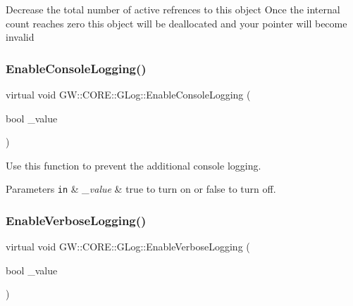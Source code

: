 Decrease the total number of active refrences to this object Once the internal count reaches zero this object will be deallocated and your pointer will become invalid \hypertarget{class_g_w_1_1_c_o_r_e_1_1_g_log_a9a486a646a0a02bb5724100c1849fcec}{}\label{class_g_w_1_1_c_o_r_e_1_1_g_log_a9a486a646a0a02bb5724100c1849fcec} 
\subsubsection{\texorpdfstring{Enable\+Console\+Logging()}{EnableConsoleLogging()}}
{\footnotesize\ttfamily virtual void G\+W\+::\+C\+O\+R\+E\+::\+G\+Log\+::\+Enable\+Console\+Logging (\begin{DoxyParamCaption}\item[{bool}]{\+\_\+value }\end{DoxyParamCaption})\hspace{0.3cm}{\ttfamily [pure virtual]}}

Use this function to prevent the additional console logging.


\begin{DoxyParams}[1]{Parameters}
\mbox{\tt in}  & {\em \+\_\+value} & true to turn on or false to turn off. \\
\hline
\end{DoxyParams}
\hypertarget{class_g_w_1_1_c_o_r_e_1_1_g_log_ac14e65291dba9480deadd772a8f0e307}{}\label{class_g_w_1_1_c_o_r_e_1_1_g_log_ac14e65291dba9480deadd772a8f0e307} 
\subsubsection{\texorpdfstring{Enable\+Verbose\+Logging()}{EnableVerboseLogging()}}
{\footnotesize\ttfamily virtual void G\+W\+::\+C\+O\+R\+E\+::\+G\+Log\+::\+Enable\+Verbose\+Logging (\begin{DoxyParamCaption}\item[{bool}]{\+\_\+value }\end{DoxyParamCaption})\hspace{0.3cm}{\ttfamily [pure virtual]}}

